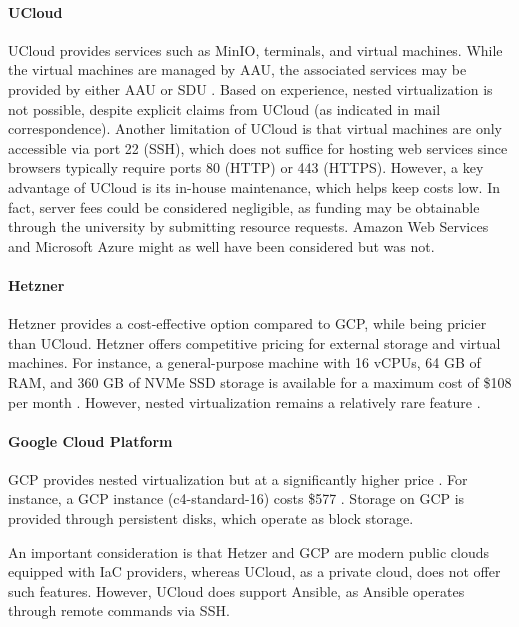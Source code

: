 \paragraph{UCloud} UCloud provides services such as MinIO, terminals, and virtual machines. While the virtual machines are managed by AAU, the associated services may be provided by either AAU or SDU \Parencite{sdu_cloud_providers}. Based on experience, nested virtualization is not possible, despite explicit claims from UCloud (as indicated in mail correspondence). Another limitation of UCloud is that virtual machines are only accessible via port 22 (SSH), which does not suffice for hosting web services since browsers typically require ports 80 (HTTP) or 443 (HTTPS). However, a key advantage of UCloud is its in-house maintenance, which helps keep costs low. In fact, server fees could be considered negligible, as funding may be obtainable through the university by submitting resource requests. Amazon Web Services and Microsoft Azure might as well have been considered but was not. 

\paragraph{Hetzner} Hetzner provides a cost-effective option compared to GCP, while being pricier than UCloud. Hetzner offers competitive pricing for external storage and virtual machines. For instance, a general-purpose machine with 16 vCPUs, 64 GB of RAM, and 360 GB of NVMe SSD storage is available for a maximum cost of \$108 per month \Parencite{hetznercloud}. However, nested virtualization remains a relatively rare feature \Parencite{hetzner_nested_virtualization}.

\paragraph{Google Cloud Platform} GCP provides nested virtualization but at a significantly higher price \Parencite{gcp_nested_virtualization}. For instance, a GCP instance (c4-standard-16) costs \$577 \Parencite{google2025pricing}. Storage on GCP is provided through persistent disks, which operate as block storage.

An important consideration is that Hetzer and GCP are modern public clouds equipped with IaC providers, whereas UCloud, as a private cloud, does not offer such features. However, UCloud does support Ansible, as Ansible operates through remote commands via SSH.

